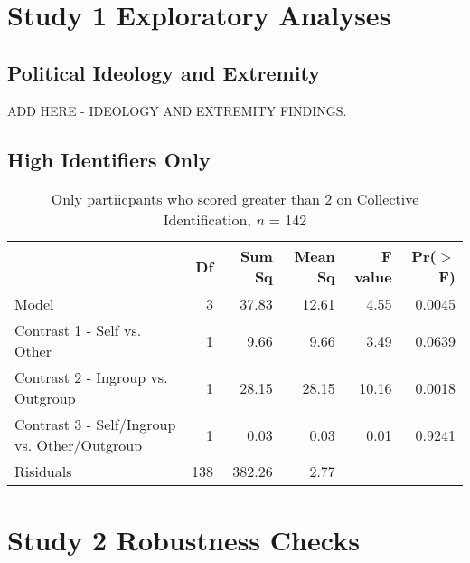 \documentclass[12pt,]{article}
\begin{document}
\newpage
\section{Study 1 Exploratory Analyses}
\label{appendix:study1_robust}


\subsection{Political Ideology and Extremity}
\label{appendix:ideo_extrem2}

ADD HERE - IDEOLOGY AND EXTREMITY FINDINGS. 



\clearpage
\subsection{High Identifiers Only}
\label{appendix:high_id1}

\begin{table}[ht]
\centering
\begin{tabular}{lrrrrr}
  \hline
 & Df & Sum Sq & Mean Sq & F value & Pr($>$F) \\ 
  \hline
Model & 3 & 37.83 & 12.61 & 4.55 & 0.0045 \\ 
  Contrast 1 - Self vs. Other & 1 & 9.66 & 9.66 & 3.49 & 0.0639 \\ 
  Contrast 2 - Ingroup vs. Outgroup & 1 & 28.15 & 28.15 & 10.16 & 0.0018 \\ 
  Contrast 3 - Self/Ingroup vs. Other/Outgroup & 1 & 0.03 & 0.03 & 0.01 & 0.9241 \\ 
  Risiduals & 138 & 382.26 & 2.77 &  &  \\ 
   \hline
\end{tabular}
\caption{Only partiicpants who scored greater than 2 on Collective Identification, \emph{n} = 142} 
\label{high_ID}
\end{table}


\newpage
\section{Study 2 Robustness Checks}
\label{appendix:robust2}
\end{document}
